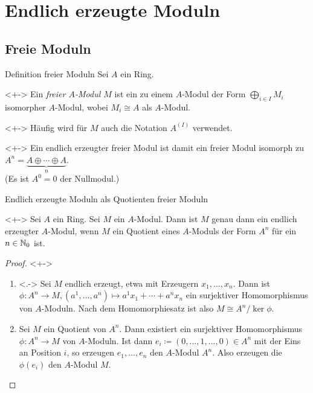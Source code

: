 \section{Endlich erzeugte Moduln}

\subsection{Freie Moduln}

\begin{frame}{Definition freier Moduln}
	Sei \(A\) ein Ring.
	\begin{definition}<+->
		Ein \emph{freier \(A\)-Modul \(M\)} ist
		ein zu einem \(A\)-Modul der Form \(\bigoplus\limits_{i \in I} M_i\) isomorpher
		\(A\)-Modul, wobei \(M_i \cong A\) als \(A\)-Modul.
	\end{definition}
	\begin{visibleenv}<+->
		Häufig wird für \(M\) auch die Notation \(A^{(I)}\) verwendet.
	\end{visibleenv}
	\begin{example}<+->
		Ein endlich erzeugter freier Modul ist damit ein freier Modul isomorph zu
		\(A^n = \underbrace{A \oplus \dotsb \oplus A}_n\).
		\\
		(Es ist \(A^0 = 0\) der Nullmodul.)
	\end{example}
\end{frame}

\begin{frame}{Endlich erzeugte Moduln als Quotienten freier Moduln}
	\begin{proposition}<+->
		Sei \(A\) ein Ring. Sei \(M\) ein \(A\)-Modul. Dann ist \(M\)
		genau dann ein endlich erzeugter \(A\)-Modul, wenn \(M\) ein
		Quotient eines \(A\)-Moduls der Form \(A^n\) für ein \(n \in \mathbb N_0\)
		ist.
	\end{proposition}
	\begin{proof}<+->
	\begin{enumerate}[<+->]
	\item<.->
		Sei \(M\) endlich erzeugt, etwa mit Erzeugern \(x_1, \dotsc, x_n\). Dann ist
		\(\phi\colon A^n \to M, (a^1, \dotsc, a^n) \mapsto a^1 x_1 + \dotsb + a^n x_n\) ein
		surjektiver Homomorphismus von \(A\)-Moduln. Nach dem Homomorphiesatz ist also
		\(M \cong A^n/\ker \phi\).
	\item
		Sei \(M\) ein Quotient von \(A^n\). Dann existiert ein surjektiver Homomorphismus
		\(\phi\colon A^n \to M\) von \(A\)-Moduln. Ist dann \(e_i \coloneqq (0, \dotsc, 1, \dotsc, 0) \in A^n\)
		mit der Eins an Position \(i\), so erzeugen \(e_1, \dotsc, e_n\) den \(A\)-Modul \(A^n\).
		Also erzeugen die \(\phi(e_i)\) den \(A\)-Modul \(M\).
		\qedhere
	\end{enumerate}
	\end{proof}
\end{frame}

